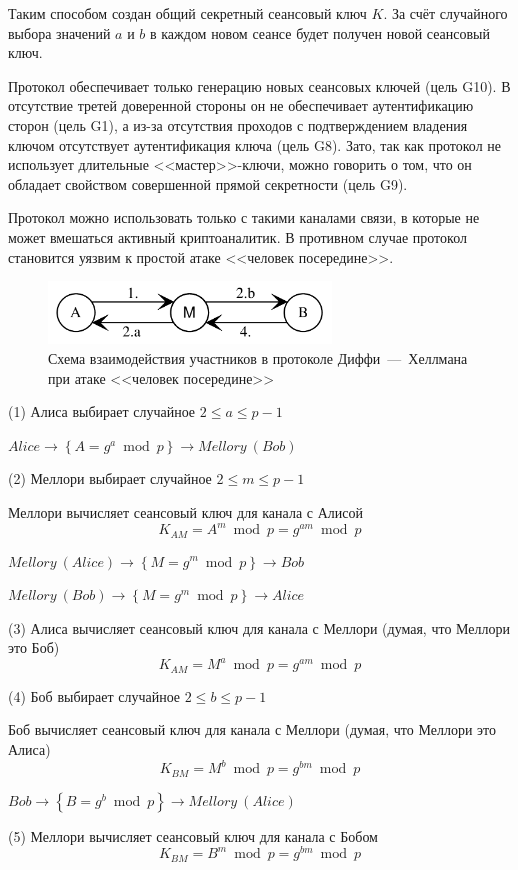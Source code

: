 Таким способом создан общий секретный сеансовый ключ $K$. За счёт случайного выбора значений $a$ и $b$ в каждом новом сеансе будет получен новой сеансовый ключ.

Протокол обеспечивает только генерацию новых сеансовых ключей (цель G10). В отсутствие третей доверенной стороны он не обеспечивает аутентификацию сторон (цель G1), а из-за отсутствия проходов с подтверждением владения ключом отсутствует аутентификация ключа (цель G8). Зато, так как протокол не использует длительные <<мастер>>-ключи, можно говорить о том, что он обладает свойством совершенной прямой секретности (цель G9).

Протокол можно использовать только с такими каналами связи, в которые не может вмешаться активный криптоаналитик. В противном случае протокол становится уязвим к простой атаке <<человек посередине>>.

\begin{figure}
    \centering
    \includegraphics[width=0.67\textwidth]{pic/key_distribution-diffie-hellman-mitm}
    \caption{Схема взаимодействия участников в протоколе Диффи~---~Хеллмана при атаке <<человек посередине>>\label{fig:key_distribution-diffie-hellman-mitm}}
\end{figure}

\begin{protocol}
    \item[(1)] Алиса выбирает случайное $2 \leq a \leq p - 1$
    \item[{}] $Alice \to \left\{ A = g ^ a \bmod p \right\} \to Mellory~(Bob)$
    \item[(2)] Меллори выбирает случайное $2 \leq m \leq p-1$
    \item[{}] Меллори вычисляет сеансовый ключ для канала с Алисой
        \[K_{AM} = A ^ m \bmod p = g ^ {am} \bmod p\]
    \item[{}] $Mellory~(Alice) \to \left\{ M = g ^ m \bmod p \right\} \to Bob$
    \item[{}] $Mellory~(Bob) \to \left\{ M = g ^ m \bmod p \right\} \to Alice$
    \item[(3)] Алиса вычисляет сеансовый ключ для канала с Меллори (думая, что Меллори это Боб)
        \[K_{AM} = M ^ a \bmod p = g ^ { am } \bmod p\]
\pagebreak
    \item[(4)] Боб выбирает случайное $2 \leq b \leq p-1$
    \item[{}] Боб вычисляет сеансовый ключ для канала с Меллори (думая, что Меллори это Алиса)
        \[K_{BM} = M ^ b \bmod p = g ^ { bm } \bmod p\]
    \item[{}] $Bob \to \left\{ B = g ^ b \bmod p \right\} \to Mellory~(Alice)$
    \item[(5)] Меллори вычисляет сеансовый ключ для канала с Бобом
        \[K_{BM} = B ^ m \bmod p = g ^ { bm } \bmod p\]
\end{protocol}


